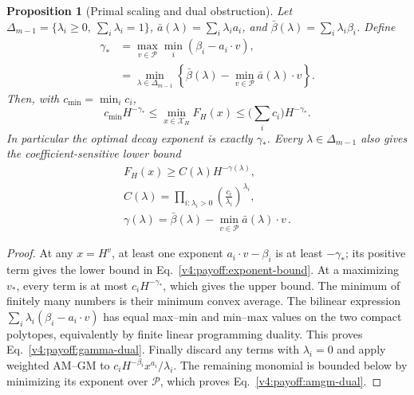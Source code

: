 \documentclass[aps,pre,reprint,amsmath,amssymb,longbibliography]{revtex4-2}
\newtheorem{proposition}[theorem]{Proposition}
\begin{document}
\begin{proposition}[Primal scaling and dual obstruction]
\label{v4:payoff:primal-dual}
Let $\Delta_{m-1}=\{\lambda_i\ge0,\ \sum_i\lambda_i=1\}$,
$\bar a(\lambda)=\sum_i\lambda_i a_i$, and
$\bar\beta(\lambda)=\sum_i\lambda_i\beta_i$. Define
\begin{align}
 \gamma_*&=\max_{v\in\mathcal P}\min_i(\beta_i-a_i\cdot v),
 \label{v4:payoff:gamma-primal}\\
 &=\min_{\lambda\in\Delta_{m-1}}
 \left\{\bar\beta(\lambda)-
       \min_{v\in\mathcal P}\bar a(\lambda)\cdot v\right\}.
 \label{v4:payoff:gamma-dual}
\end{align}
Then, with $c_{\min}=\min_i c_i$,
\begin{equation}\label{v4:payoff:exponent-bound}
 c_{\min}H^{-\gamma_*}\le\min_{x\in\mathcal X_H}F_H(x)
 \le\Big(\sum_i c_i\Big)H^{-\gamma_*}.
\end{equation}
In particular the optimal decay exponent is exactly $\gamma_*$. Every
$\lambda\in\Delta_{m-1}$ also gives the coefficient-sensitive lower bound
\begin{equation}\label{v4:payoff:amgm-dual}
 \begin{gathered}
 F_H(x)\ge C(\lambda)H^{-\gamma(\lambda)},\\
 C(\lambda)=\prod_{i:\lambda_i>0}
                 \left(\frac{c_i}{\lambda_i}\right)^{\lambda_i},\\
 \gamma(\lambda)=\bar\beta(\lambda)-
      \min_{v\in\mathcal P}\bar a(\lambda)\cdot v\,.
 \end{gathered}
\end{equation}
\end{proposition}
\begin{proof}
At any $x=H^v$, at least one exponent
$a_i\cdot v-\beta_i$ is at least $-\gamma_*$; its positive term gives the
lower bound in Eq.~\eqref{v4:payoff:exponent-bound}. At a maximizing $v_*$,
every term is at most $c_iH^{-\gamma_*}$, which gives the upper bound.
The minimum of finitely many numbers is their minimum convex average.
The bilinear expression
$\sum_i\lambda_i(\beta_i-a_i\cdot v)$ has equal max--min and min--max
values on the two compact polytopes, equivalently by finite linear
programming duality. This proves Eq.~\eqref{v4:payoff:gamma-dual}.
Finally discard any terms with $\lambda_i=0$ and apply weighted AM--GM to
$c_iH^{-\beta_i}x^{a_i}/\lambda_i$. The remaining monomial is bounded
below by minimizing its exponent over $\mathcal P$, which proves
Eq.~\eqref{v4:payoff:amgm-dual}.
\end{proof}
\end{document}

